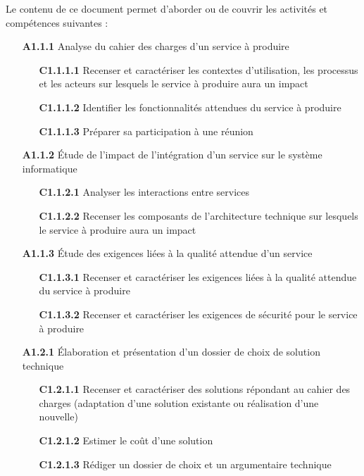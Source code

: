 \documentclass[12pt,a4paper,oneside,titlepage,final]{article}
\begin{document}
Le contenu de ce document permet d'aborder ou de couvrir les activités
et compétences suivantes :
\begin{enumerate}
  \item [\textbf{A1.1.1}] Analyse du cahier des charges d'un service à
  produire
  \begin{itemize}
    \item [\textbf{C1.1.1.1}] Recenser et caractériser les contextes
    d'utilisation, les processus et les acteurs sur lesquels le
    service à produire aura un impact
    \item [\textbf{C1.1.1.2}] Identifier les fonctionnalités attendues
    du service à produire
    \item [\textbf{C1.1.1.3}] Préparer sa participation à une réunion
  \end{itemize}
  \item [\textbf{A1.1.2}] Étude de l'impact de l'intégration d'un
  service sur le système informatique
  \begin{itemize}
    \item [\textbf{C1.1.2.1}] Analyser les interactions entre
    services
    \item [\textbf{C1.1.2.2}] Recenser les composants de
    l'architecture technique sur lesquels le service à produire aura
    un impact
  \end{itemize}
  \item [\textbf{A1.1.3}] Étude des exigences liées à la qualité
  attendue d'un service
  \begin{itemize}
    \item [\textbf{C1.1.3.1}] Recenser et caractériser les
    exigences liées à la qualité attendue du service à produire
    \item [\textbf{C1.1.3.2}] Recenser et caractériser les exigences
    de sécurité pour le service à produire
  \end{itemize}
  \item [\textbf{A1.2.1}] Élaboration et présentation d'un dossier de
  choix de solution technique
  \begin{itemize}
    \item [\textbf{C1.2.1.1}] Recenser et caractériser des
    solutions répondant au cahier des charges (adaptation d'une
    solution existante ou réalisation d'une nouvelle)
    \item [\textbf{C1.2.1.2}] Estimer le coût d'une solution
    \item [\textbf{C1.2.1.3}] Rédiger un dossier de choix et un
    argumentaire technique

\end{itemize}
\end{enumerate}
\end{document}
